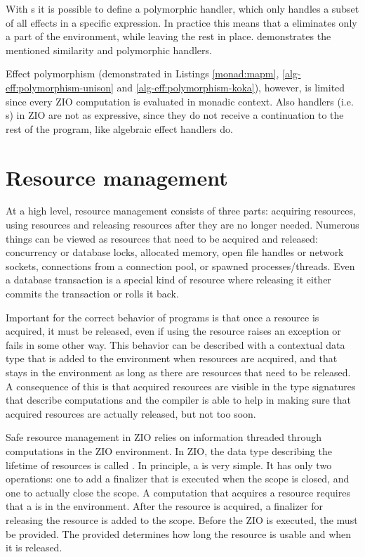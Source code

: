With s it is possible to define a polymorphic handler, which only handles a subset of all effects in a specific expression. In practice this means that a  eliminates only a part of the environment, while leaving the rest in place.  demonstrates the mentioned similarity and polymorphic handlers.



Effect polymorphism (demonstrated in Listings \ref{monad:mapm}, \ref{alg-eff:polymorphism-unison} and \ref{alg-eff:polymorphism-koka}), however, is limited since every ZIO computation is evaluated in monadic context. Also handlers (i.e. s) in ZIO are not as expressive, since they do not receive a continuation to the rest of the program, like algebraic effect handlers do.


\section{Resource management} \label{zio:resource-management}
At a high level, resource management consists of three parts: acquiring resources, using resources and releasing resources after they are no longer needed. Numerous things can be viewed as resources that need to be acquired and released: concurrency or database locks, allocated memory, open file handles or network sockets, connections from a connection pool, or spawned processes/threads. Even a database transaction is a special kind of resource where releasing it either commits the transaction or rolls it back.

Important for the correct behavior of programs is that once a resource is acquired, it must be released, even if using the resource raises an exception or fails in some other way. This behavior can be described with a contextual data type that is added to the environment when resources are acquired, and that stays in the environment as long as there are resources that need to be released. A consequence of this is that acquired resources are visible in the type signatures that describe computations and the compiler is able to help in making sure that acquired resources are actually released, but not too soon.

Safe resource management in ZIO relies on information threaded through computations in the ZIO environment. In ZIO, the data type describing the lifetime of resources is called . In principle, a  is very simple. It has only two operations: one to add a finalizer that is executed when the scope is closed, and one to actually close the scope. A computation that acquires a resource requires that a  is in the environment. After the resource is acquired, a finalizer for releasing the resource is added to the scope. Before the ZIO is executed, the  must be provided. The provided  determines how long the resource is usable and when it is released. 

